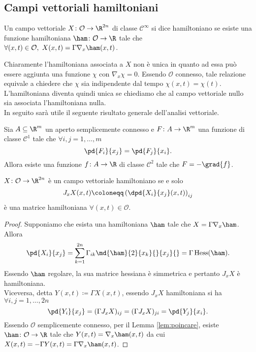 \subsection{Campi vettoriali hamiltoniani}

\begin{definition}
    Un campo vettoriale $ X \colon \mathcal{O} \to \R^{2n} $ di classe $ \mathcal{C}^\infty $ si dice hamiltoniano se esiste una funzione hamiltoniana $ \ham \colon \mathcal{O} \to \R $ tale che $ \forall (x, t) \in \mathcal{O}, \ X(x, t) = \Gamma \nabla_x \ham(x, t) $.
\end{definition}

Chiaramente l'hamiltoniana associata a $ X $ non è unica in quanto ad essa può essere aggiunta una funzione $ \chi $ con $ \nabla_x \chi = 0 $. Essendo $ \mathcal{O} $ connesso, tale relazione equivale a chiedere che $ \chi $ sia indipendente dal tempo $ \chi(x, t) = \chi(t) $. L'hamiltoniana diventa quindi unica se chiediamo che al campo vettoriale nullo sia associata l'hamiltoniana nulla. \\

In seguito sarà utile il seguente risultato generale dell'analisi vettoriale.

\begin{lemma}[Poincaré] \label{lem:poincare}
    Sia $ A \subseteq \R^m $ un aperto semplicemente connesso e $ F \colon A \to \R^m $ una funzione di classe $ \mathcal{C}^1 $ tale che $ \forall i, j = 1, \ldots, m $
    \[
        \pd{F_i}{x_j} = \pd{F_j}{x_i}.
    \]
    Allora esiste una funzione $ f \colon A \to \R $ di classe $ \mathcal{C}^2 $ tale che $ F = - \grad{f} $.
\end{lemma}

\begin{thm}
    $ X \colon \mathcal{O} \to \R^{2n} $ è un campo vettoriale hamiltoniano se e solo
    \begin{equation}
        J_x X (x, t) \coloneqq \left(\dpd{X_i}{x_j}(x, t)\right)_{ij}
    \end{equation}
    è una matrice hamiltoniana $ \forall (x, t) \in \mathcal{O} $.
\end{thm}
\begin{proof}
    Supponiamo che esista una hamiltoniana $ \ham $ tale che $ X = \Gamma \nabla_x \ham $. Allora
    \[
        \pd{X_i}{x_j} = \sum_{k=1}^{2n} \Gamma_{ik} \md{\ham}{2}{x_k}{}{x_j}{} = \Gamma \, \mathrm{Hess}(\ham).
    \]
    Essendo $ \ham $ regolare, la sua matrice hessiana è simmetrica e pertanto $ J_x X $ è hamiltoniana. \\
    Viceversa, detta $ Y(x, t) \coloneqq \Gamma X(x, t) $, essendo $ J_x X $ hamiltoniana si ha $ \forall i, j = 1, \ldots, 2n $
    \[
        \pd{Y_i}{x_j} = (\Gamma J_x X)_{ij} = (\Gamma J_x X)_{ji} = \pd{Y_j}{x_i}.
    \]
    Essendo $ \mathcal{O} $ semplicemente connesso, per il Lemma \ref{lem:poincare},  esiste $ \ham \colon \mathcal{O} \to \R $ tale che $ Y(x, t) = \nabla_x \ham(x, t) $ da cui $ X(x, t) = -\Gamma Y(x, t) = \Gamma \nabla_x \ham(x, t) $.
\end{proof}


